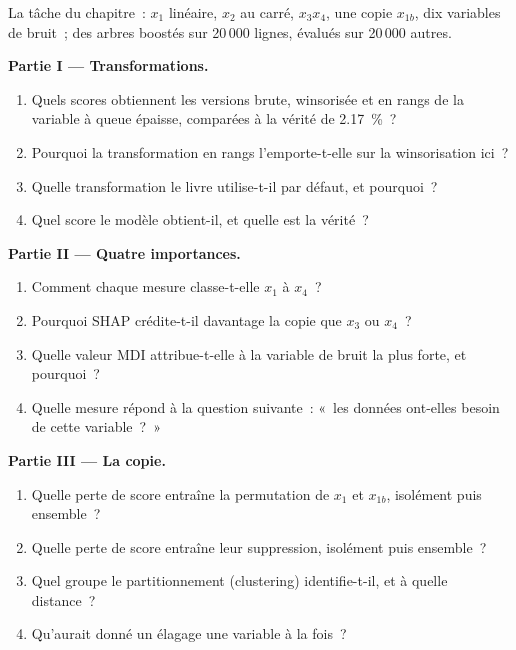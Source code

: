 \begin{problem}\label{pb:ml:feature-engineering-selection-and-importance:1}
La tâche du chapitre~: $x_1$ linéaire, $x_2$ au carré, $x_3x_4$, une copie $x_{1b}$, dix variables de bruit~; des arbres boostés sur 20\,000
lignes, évalués sur 20\,000 autres.

\medskip\noindent\textbf{Partie I --- Transformations.}
\begin{enumerate}
\item Quels scores obtiennent les versions brute, winsorisée et en rangs de la variable à queue épaisse, comparées à la vérité de 2.17~\%~?
\item Pourquoi la transformation en rangs l'emporte-t-elle sur la winsorisation ici~?
\item Quelle transformation le livre utilise-t-il par défaut, et pourquoi~?
\item Quel score le modèle obtient-il, et quelle est la vérité~?
\end{enumerate}

\medskip\noindent\textbf{Partie II --- Quatre importances.}
\begin{enumerate}[resume]
\item Comment chaque mesure classe-t-elle $x_1$ à $x_4$~?
\item Pourquoi SHAP crédite-t-il davantage la copie que $x_3$ ou $x_4$~?
\item Quelle valeur MDI attribue-t-elle à la variable de bruit la plus forte, et pourquoi~?
\item Quelle mesure répond à la question suivante~: «~les données ont-elles besoin de cette variable~?~»
\end{enumerate}

\medskip\noindent\textbf{Partie III --- La copie.}
\begin{enumerate}[resume]
\item Quelle perte de score entraîne la permutation de $x_1$ et $x_{1b}$, isolément puis ensemble~?
\item Quelle perte de score entraîne leur suppression, isolément puis ensemble~?
\item Quel groupe le partitionnement (clustering) identifie-t-il, et à quelle distance~?
\item Qu'aurait donné un élagage une variable à la fois~?
\end{enumerate}


\end{problem}
